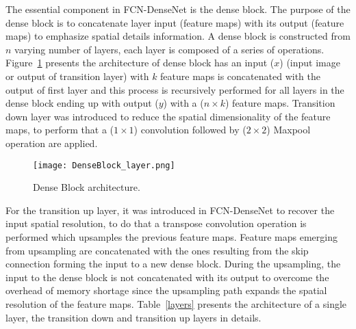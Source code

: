 \documentclass[preprint,9pt]{elsarticle}
\begin{document}
	The essential component in FCN-DenseNet is the dense block.
	The purpose of the dense block is to concatenate layer input (feature maps) with its output (feature maps) to emphasize spatial details information.
	A dense block is constructed from \(n\) varying number of layers, each layer is composed of a series of operations.
	Figure~\ref{dense_block} presents the architecture of dense block has an input (\(x\)) (input image or output of transition layer) with \(k\) feature maps is concatenated with the output of first layer and this process is recursively performed for all layers in the dense block ending up with output (\(y\)) with a (\(n\times k\)) feature maps. 
	Transition down layer was introduced to reduce the spatial dimensionality of the feature maps, to perform that a (\(1\times 1\))  convolution followed by (\(2\times2\)) Maxpool operation are applied. 

	\begin{figure} [h!]
		\begin{center}
			\texttt{[image: DenseBlock\_layer.png]}
		\end{center}
		\caption{Dense Block architecture.} 
		\label{dense_block}
	\end{figure}

	For the transition up layer, it was introduced in FCN-DenseNet to recover the input spatial resolution, to do that a transpose convolution operation is performed which upsamples the previous feature maps.
	Feature maps emerging from upsampling are concatenated with the ones resulting from the skip connection forming the input to a new dense block.
	During the upsampling, the input to the dense block is not concatenated with its output to overcome the overhead of memory shortage since the upsampling path expands the spatial resolution of the feature maps.
	Table~\ref{layers} presents the architecture of a single layer, the transition down  and transition up layers in details.
\end{document}
